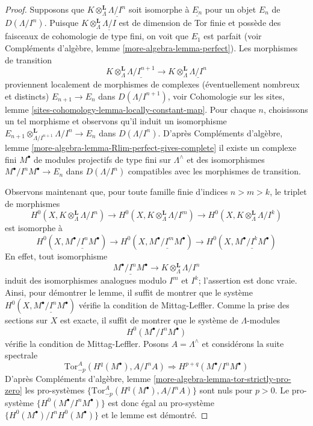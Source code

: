 \begin{proof}
Supposons que $K \otimes_\Lambda^\mathbf{L} \underline{\Lambda/I^n}$ soit isomorphe
à $\underline{E_n}$ pour un objet $E_n$ de $D(\Lambda/I^n)$.
Puisque $K \otimes_\Lambda^\mathbf{L} \underline{\Lambda/I}$ est de
dimension de Tor finie et possède des faisceaux de cohomologie de type fini,
on voit que $E_1$ est parfait (voir
Compléments d'algèbre, lemme \ref{more-algebra-lemma-perfect}). Les morphismes de transition
$$
K \otimes_\Lambda^\mathbf{L} \underline{\Lambda/I^{n + 1}}
\to
K \otimes_\Lambda^\mathbf{L} \underline{\Lambda/I^n}
$$
proviennent localement de morphismes de complexes (éventuellement nombreux et distincts)
$E_{n + 1} \to E_n$ dans $D(\Lambda/I^{n + 1})$, voir
Cohomologie sur les sites, lemme \ref{sites-cohomology-lemma-locally-constant-map}.
Pour chaque $n$, choisissons un tel morphisme et observons qu'il induit
un isomorphisme
$E_{n + 1} \otimes_{\Lambda/I^{n + 1}}^\mathbf{L} \Lambda/I^n \to E_n$
dans $D(\Lambda/I^n)$. D'après
Compléments d'algèbre, lemme \ref{more-algebra-lemma-Rlim-perfect-gives-complete}
il existe un complexe fini $M^\bullet$ de modules projectifs de type fini sur
$\Lambda^\wedge$ et des isomorphismes $M^\bullet/I^nM^\bullet \to E_n$
dans $D(\Lambda/I^n)$ compatibles avec les morphismes de transition.

\medskip\noindent
Observons maintenant que, pour toute famille finie d'indices
$n > m > k$, le triplet de morphismes
$$
H^0(X, K \otimes_\Lambda^\mathbf{L} \Lambda/I^n)
\to
H^0(X, K \otimes_\Lambda^\mathbf{L} \Lambda/I^m)
\to
H^0(X, K \otimes_\Lambda^\mathbf{L} \Lambda/I^k)
$$
est isomorphe à
$$
H^0(X, \underline{M^\bullet/I^nM^\bullet})
\to
H^0(X, \underline{M^\bullet/I^mM^\bullet})
\to
H^0(X, \underline{M^\bullet/I^kM^\bullet})
$$
En effet, tout isomorphisme
$$
\underline{M^\bullet/I^nM^\bullet} \to
K \otimes_\Lambda^\mathbf{L} \Lambda/I^n
$$
induit des isomorphismes analogues modulo $I^m$ et $I^k$; l'assertion est donc
vraie. Ainsi, pour démontrer le lemme, il suffit de montrer que
le système
$H^0(X, \underline{M^\bullet/I^nM^\bullet})$ vérifie la condition de Mittag-Leffler.
Comme la prise des sections sur $X$ est exacte, il suffit de montrer que
le système de $\Lambda$-modules
$$
H^0(M^\bullet/I^nM^\bullet)
$$
vérifie la condition de Mittag-Leffler. Posons $A = \Lambda^\wedge$ et considérons la suite
spectrale
$$
\text{Tor}_{-p}^A(H^q(M^\bullet), A/I^nA) \Rightarrow
H^{p + q}(M^\bullet/I^nM^\bullet)
$$
D'après Compléments d'algèbre, lemme \ref{more-algebra-lemma-tor-strictly-pro-zero}
les pro-systèmes $\{\text{Tor}_{-p}^A(H^q(M^\bullet), A/I^nA)\}$ sont nuls
pour $p > 0$. Le pro-système $\{H^0(M^\bullet/I^nM^\bullet)\}$
est donc égal au pro-système $\{H^0(M^\bullet)/I^nH^0(M^\bullet)\}$
et le lemme est démontré.
\end{proof}

